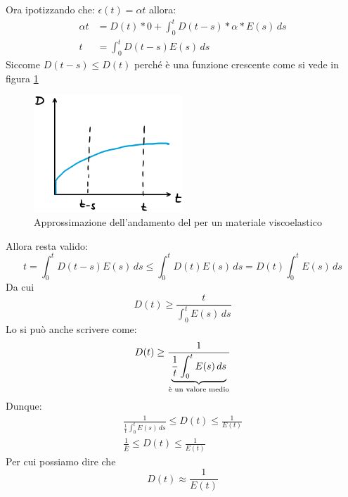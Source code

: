 Ora ipotizzando che: $\epsilon(t) = \alpha t$ allora:
\begin{equation}
\begin{split}
\alpha t &= D(t) * 0 + \int_0^t{D(t-s)*\alpha*E(s)\,ds}\\
t &= \int_0^t{D(t-s)E(s)\,ds}
\end{split}
\end{equation}
Siccome $D(t-s) \leq D(t)$ perché è una funzione crescente come si vede in figura \ref{fig:Creep}
\begin{figure}
\centering
\includegraphics[width = 0.5\textwidth]{gfx/Creep}
\caption{Approssimazione dell'andamento del  per un materiale viscoelastico}
\label{fig:Creep}
\end{figure}
Allora resta valido:
\begin{equation}
t = \int_0^t{D(t-s)E(s)\,ds} \leq \int_0^t{D(t)E(s)\,ds} = D(t)\int_0^t{E(s)\,ds}
\end{equation}
Da cui
\begin{equation}
D(t) \geq \frac{t}{\int_0^t{E(s)\,ds}}
\end{equation}
Lo si può anche scrivere come:
\begin{equation}
D(t) \geq \frac{1}{\underbrace{\frac{1}{t}\int_0^t{E(s)\,ds}}_{\textup{è un valore medio}}}
\end{equation}
Dunque:
\begin{equation}
\begin{split}
\frac{1}{\frac{1}{t}\int_0^t{E(s)\,ds}} \leq D(t) \leq \frac{1}{E(t)}\\
\frac{1}{\bar{E}} \leq D(t) \leq \frac{1}{E(t)}
\end{split}
\end{equation}
Per cui possiamo dire che 
\begin{equation}
D(t) \approx \frac{1}{E(t)}
\end{equation}

